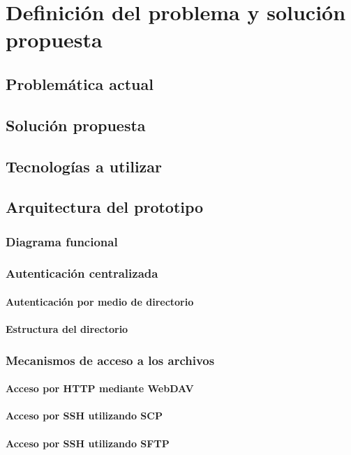   \label{chap:cap2}
  \chapter {Definici\'{o}n del problema y soluci\'{o}n propuesta}
    \section {Problem\'{a}tica actual}
    \section {Soluci\'{o}n propuesta}
    \section {Tecnolog\'{i}as a utilizar}
    \section {Arquitectura del prototipo}
      \subsection {Diagrama funcional}
      \subsection {Autenticaci\'{o}n centralizada}
        \subsubsection {Autenticaci\'{o}n por medio de directorio}
        \subsubsection {Estructura del directorio}
      \subsection {Mecanismos de acceso a los archivos}
        \subsubsection {Acceso por HTTP mediante WebDAV}
        \subsubsection {Acceso por SSH utilizando SCP}
        \subsubsection {Acceso por SSH utilizando SFTP}
